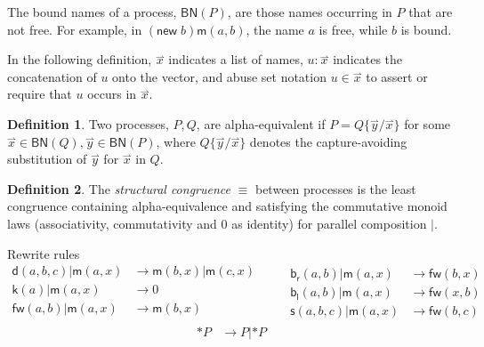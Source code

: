 \documentclass[submission,copyright,creativecommons]{eptcs}
\newcommand{\new}{\mathsf{new}}
\newcommand{\pzero}{\mathbin{0}}
\newcommand{\scong}{\mathbin{\equiv}}
\newcommand{\boundnames}[1]{\mathbin{\mathsf{BN}(#1)}}
\newcommand{\red}{\rightarrow}
\newcommand{\vect}[1]{\stackrel{\rightharpoonup}{#1}}
\theoremstyle{definition}
\newtheorem{definition}{Definition}
\theoremstyle{remark}
\theoremstyle{remark}
\begin{document}
The bound names of a process, $\boundnames{P}$, are those names occurring in $P$
that are not free. For example, in $(\new\; b)\mathsf{m}(a,b)$, the name $a$ is free, while $b$ is bound.

In the following definition, $\vect{x}$ indicates a list of names,
$u:\vect{x}$ indicates the concatenation of $u$ onto the vector, and
abuse set notation $u \in \vect{x}$ to assert or require that $u$
occurs in $\vect{x}$.

\begin{definition}
Two processes, $P,Q$, are alpha-equivalent if $P = Q\{\vect{y}/\vect{x}\}$ for
some $\vect{x} \in \boundnames{Q},\vect{y} \in \boundnames{P}$, where $Q\{\vect{y}/\vect{x}\}$
denotes the capture-avoiding substitution of $\vect{y}$ for $\vect{x}$ in $Q$.
\end{definition}

\begin{definition}
  The {\em structural congruence} $\equiv$
  between processes \cite{SangiorgiWalker} is the least congruence containing
  alpha-equivalence and satisfying the commutative monoid laws
  (associativity, commutativity and $\pzero$ as identity) for parallel
  composition $|$.
\end{definition}

Rewrite rules
\[\begin{array}{rl}
  \mathsf{d}(a,b,c) | \mathsf{m}(a,x) & \red \mathsf{m}(b,x) | \mathsf{m}(c,x) \\
  \mathsf{k}(a) | \mathsf{m}(a,x) & \red 0 \\
  \mathsf{fw}(a,b) | \mathsf{m}(a,x) & \red \mathsf{m}(b,x) \\
\end{array} \quad \quad
\begin{array}{rl}
  \mathsf{b}_{\mathsf{r}}(a,b) | \mathsf{m}(a,x) & \red \mathsf{fw}(b,x) \\
  \mathsf{b}_{\mathsf{l}}(a,b) | \mathsf{m}(a,x) & \red \mathsf{fw}(x,b) \\
  \mathsf{s}(a,b,c) | \mathsf{m}(a,x) & \red \mathsf{fw}(b,c)
\end{array}\]
\[\begin{array}{rl}
  \mathsf{*}P & \red P|\mathsf{*}P \\
\end{array}\]
\end{document}
